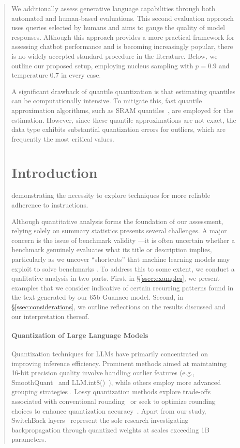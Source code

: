 \begin{quote}
We additionally assess generative language capabilities through both automated and human-based evaluations. This second evaluation approach uses queries selected by humans and aims to gauge the quality of model responses. Although this approach provides a more practical framework for assessing chatbot performance and is becoming increasingly popular, there is no widely accepted standard procedure in the literature. Below, we outline our proposed setup, employing nucleus sampling with $p=0.9$ and temperature $0.7$ in every case.

A significant drawback of quantile quantization is that estimating quantiles can be computationally intensive. To mitigate this, fast quantile approximation algorithms, such as SRAM quantiles~\citep{dettmers2022optimizers}, are employed for the estimation. However, since these quantile approximations are not exact, the data type exhibits substantial quantization errors for outliers, which are frequently the most critical values.

\section{Introduction}

demonstrating the necessity to explore techniques for more reliable adherence to instructions.

Although quantitative analysis forms the foundation of our assessment, relying solely on summary statistics presents several challenges. A major concern is the issue of benchmark validity \citep{liao2021we}—it is often uncertain whether a benchmark genuinely evaluates what its title or description implies, particularly as we uncover ``shortcuts'' that machine learning models may exploit to solve benchmarks \citep{gururangan2018annotation, poliak2018hypothesis}. To address this to some extent, we conduct a qualitative analysis in two parts. First, in \S\ref{ssec:examples}, we present examples that we consider indicative of certain recurring patterns found in the text generated by our 65b {Guanaco} model. Second, in \S\ref{ssec:considerations}, we outline reflections on the results discussed and our interpretation thereof.

\paragraph{Quantization of Large Language Models} Quantization techniques for LLMs have primarily concentrated on improving inference efficiency. Prominent methods aimed at maintaining 16-bit precision quality involve handling outlier features (e.g., SmoothQuant~\citep{xiao2022smoothquant} and LLM.int8()~\citep{dettmers2022llm}), while others employ more advanced grouping strategies \citep{park2022nuqmm, yao2022zeroquant}. Lossy quantization methods explore trade-offs associated with conventional rounding~\citep{dettmers2022case,zeng2022glm,pope2022efficiently} or seek to optimize rounding choices to enhance quantization accuracy~\citep{frantar2022gptq}. Apart from our study, SwitchBack layers~\citep{wortsman2023stable} represent the sole research investigating backpropagation through quantized weights at scales exceeding 1B parameters.


\end{quote}

